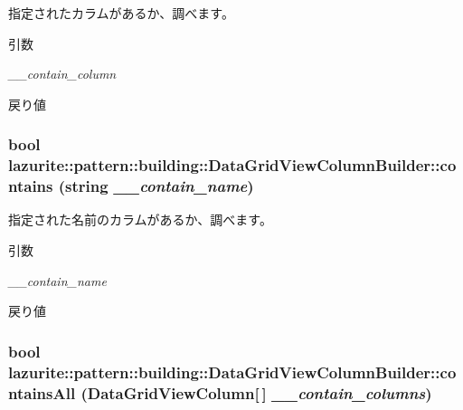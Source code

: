 指定されたカラムがあるか、調べます。 
\begin{DoxyParams}{引数}
\item[{\em \_\-\_\-contain\_\-column}]\end{DoxyParams}
\begin{DoxyReturn}{戻り値}

\end{DoxyReturn}
\hypertarget{classlazurite_1_1pattern_1_1building_1_1_data_grid_view_column_builder_a57b48f39ff894e5a0dba10c01b740579}{
\subsubsection[{contains}]{\setlength{\rightskip}{0pt plus 5cm}bool lazurite::pattern::building::DataGridViewColumnBuilder::contains (string {\em \_\-\_\-contain\_\-name})}}
\label{classlazurite_1_1pattern_1_1building_1_1_data_grid_view_column_builder_a57b48f39ff894e5a0dba10c01b740579}


指定された名前のカラムがあるか、調べます。 
\begin{DoxyParams}{引数}
\item[{\em \_\-\_\-contain\_\-name}]\end{DoxyParams}
\begin{DoxyReturn}{戻り値}

\end{DoxyReturn}
\hypertarget{classlazurite_1_1pattern_1_1building_1_1_data_grid_view_column_builder_aead7db29d56803d88fd85a2e02ded6b6}{
\subsubsection[{containsAll}]{\setlength{\rightskip}{0pt plus 5cm}bool lazurite::pattern::building::DataGridViewColumnBuilder::containsAll (DataGridViewColumn\mbox{[}$\,$\mbox{]} {\em \_\-\_\-contain\_\-columns})}}
\label{classlazurite_1_1pattern_1_1building_1_1_data_grid_view_column_builder_aead7db29d56803d88fd85a2e02ded6b6}

